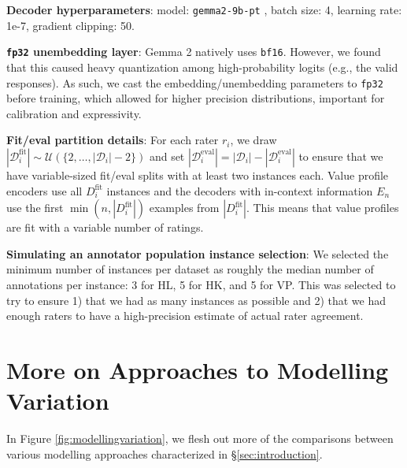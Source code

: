 \documentclass[11pt]{article}
\begin{document}
\textbf{Decoder hyperparameters}: model: \texttt{gemma2-9b-pt} \citep{gemmateam2024gemma2improvingopen}, batch size: 4, learning rate: 1e-7, gradient clipping: 50.

\textbf{\texttt{fp32} unembedding layer}:
Gemma 2 \citep{gemmateam2024gemma2improvingopen} natively uses \texttt{bf16}. However, we found that this caused heavy quantization among high-probability logits (e.g., the valid responses). As such, we cast the embedding/unembedding parameters to \texttt{fp32} before training, which allowed for higher precision distributions, important for calibration and expressivity.

\textbf{Fit/eval partition details}: For each rater $r_i$, 
we draw $|\mathcal{D}_i^{\text{fit}}| \sim \mathcal{U}(\{2,\ldots,|\mathcal{D}_i|-2\})$ and set $|\mathcal{D}_i^\text{eval}| = |\mathcal{D}_i| - |\mathcal{D}_i^\text{eval}|$ to ensure that  we have variable-sized fit/eval splits with at least two instances each. Value profile encoders use all $D_i^\text{fit}$ instances and the decoders with in-context information $E_n$ use the first $\min(n, |D_i^\text{fit}|)$ examples from $|D_i^\text{fit}|$. This means that value profiles are fit with a variable number of ratings.

\textbf{Simulating an annotator population instance selection}: We selected the minimum number of instances per dataset as roughly the median number of annotations per instance: 3 for HL, 5 for HK, and 5 for VP. This was selected to try to ensure 1) that we had as many instances as possible and 2) that we had enough raters to have a high-precision estimate of actual rater agreement.


\section{More on Approaches to Modelling Variation}
\label{app:modellingvariation}

In Figure \ref{fig:modellingvariation}, we flesh out more of the comparisons between various modelling approaches characterized in \S \ref{sec:introduction}.

\end{document}
